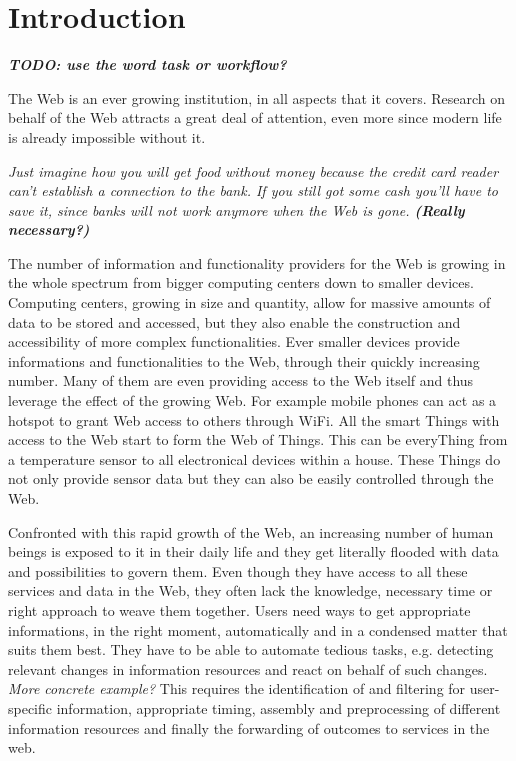 
\chapter{Introduction}

\textit{\textbf{TODO: use the word task or workflow?}}

The Web is an ever growing institution, in all aspects that it covers.
Research on behalf of the Web attracts a great deal of attention, even more since modern life is already impossible without it.

\textit{Just imagine how you will get food without money because the credit card reader can't establish a connection to the bank.
If you still got some cash you'll have to save it, since banks will not work anymore when the Web is gone. \textbf{(Really necessary?)}}

The number of information and functionality providers for the Web is growing in the whole spectrum from bigger computing centers down to smaller devices.
Computing centers, growing in size and quantity, allow for massive amounts of data to be stored and accessed, but they also enable the construction and accessibility of more complex functionalities.
Ever smaller devices provide informations and functionalities to the Web, through their quickly increasing number.
Many of them are even providing access to the Web itself and thus leverage the effect of the growing Web.
For example mobile phones can act as a hotspot to grant Web access to others through \textrm{WiFi}.
All the smart \textrm{Things} with access to the Web start to form the \textrm{Web of Things}.
This can be every\textrm{Thing} from a temperature sensor to all electronical devices within a house.
These \textrm{Things} do not only provide sensor data but they can also be easily controlled through the Web.

Confronted with this rapid growth of the Web, an increasing number of human beings is exposed to it in their daily life and they get literally flooded with data and possibilities to govern them.
Even though they have access to all these services and data in the Web, they often lack the knowledge, necessary time or right approach to weave them together.
Users need ways to get appropriate informations, in the right moment, automatically and in a condensed matter that suits them best.
They have to be able to automate tedious tasks, e.g. detecting relevant changes in information resources and react on behalf of such changes.
\textit{\small{More concrete example?}}
This requires the identification of and filtering for user-specific information, appropriate timing, assembly and preprocessing of different information resources and finally the forwarding of outcomes to services in the web. 

